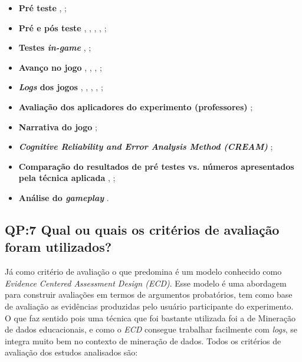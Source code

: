 \documentclass[12pt]{article}
\begin{document}
\begin{itemize}
    \item \textbf{Pré teste} \cite{moreno2007game}, \cite{del2010easing};
    \item \textbf{Pré e pós teste} \cite{rowe2017assessing}, \cite{kam2007localized}, \cite{kam2009improving}, \cite{harpstead2013search}, \cite{baron2014approach};
    \item \textbf{Testes \textit{in-game}} \cite{del2010easing}, \cite{de20163d};
    \item \textbf{Avanço no jogo} \cite{del2010easing}, \cite{harpstead2013search}, \cite{nyamsuren2017automated}, \cite{mota2017environment};
    \item \textbf{\textit{Logs} dos jogos} \cite{rowe2017assessing}, \cite{falakmasir2016data}, \cite{georgiadis2019bolstering}, \cite{georgiadis2019reinforcing}, \cite{min2019deepstealth};
    \item \textbf{Avaliação dos aplicadores do experimento (professores)} \cite{rowe2017assessing};
    \item \textbf{Narrativa do jogo} \cite{moreno2007game};
    \item \textbf{\textit{Cognitive Reliability and Error Analysis Method (CREAM)}} \cite{thomas2012evaluate};
    \item \textbf{Comparação do resultados de pré testes vs. números apresentados pela técnica aplicada} \cite{thomas2012evaluate}, \cite{conrad2014framework};
    \item \textbf{Análise do \textit{gameplay}} \cite{asbell2013assessment}.
\end{itemize}

\subsection{QP:7 Qual ou quais os critérios de avaliação foram utilizados?}

Já como critério de avaliação o que predomina é um modelo conhecido como \textit{Evidence Centered Assessment Design (ECD)}. Esse modelo é uma abordagem para construir avaliações em termos de argumentos probatórios, tem como base de avaliação as evidências produzidas pelo usuário participante do experimento. O que faz sentido pois uma técnica que foi bastante utilizada foi a de Mineração de dados educacionais, e como o \textit{ECD} consegue trabalhar facilmente com \textit{logs}, se integra muito bem no contexto de mineração de dados. Todos os critérios de avaliação dos estudos analisados são:
\end{document}
